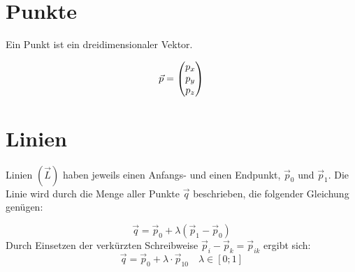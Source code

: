 \section{Punkte}
Ein Punkt ist ein dreidimensionaler Vektor.

\begin{equation}
	\vec{p} = \begin{pmatrix}p_{x} \\ p_{y} \\ p_{z}\end{pmatrix}
\end{equation}

\section{Linien}
Linien $(\vec{L})$ haben jeweils einen Anfangs- und einen Endpunkt, $\vec{p}_{0}$ und $\vec {p}_{1}$. Die Linie wird durch die Menge aller Punkte $\vec{q}$ beschrieben, die folgender Gleichung genügen:

\begin{equation*}
	\vec{q} = \vec{p}_{0} + \lambda (\vec{p}_{1} - \vec{p}_{0})
\end{equation*}
Durch Einsetzen der verkürzten Schreibweise $\vec{p}_{i} - \vec{p}_{k} = \vec{p}_{ik}$ ergibt sich:
\begin{equation}
	\boxed{ \vec{q} = \vec{p}_{0} + \lambda \cdot \vec{p}_{10} } \quad \lambda \in [0; 1]
\end{equation}